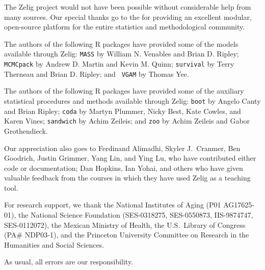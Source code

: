 The Zelig project would not have been possible without considerable
help from many sources.  Our special thanks go to the  for providing an
excellent modular, open-source platform for the entire statistics and
methodological community.

The authors of the following R packages have provided some of the
models available through Zelig: {\tt MASS} by William N. Venables and
Brian D. Ripley; {\tt MCMCpack} by Andrew D. Martin and Kevin M.
Quinn; {\tt survival} by Terry Therneau and Brian D. Ripley; and {\tt
  VGAM} by Thomas Yee.  

The authors of the following R packages have provided some of the
auxiliary statistical procedures and methods available through Zelig:
{\tt boot} by Angelo Canty and Brian Ripley; {\tt coda} by Martyn
Plummer, Nicky Best, Kate Cowles, and Karen Vines; {\tt sandwich} by
Achim Zeileis; and {\tt zoo} by Achim Zeileis and Gabor Grothendieck.

Our appreciation also goes to Ferdinand Alimadhi, Skyler J.\ Cranmer,
Ben Goodrich, Justin Grimmer, Yang Lin, and Ying Lu, who have
contributed either code or documentation; Dan Hopkins, Ian Yohai, and
others who have given valuable feedback from the courses in which they
have used Zelig as a teaching tool.

For research support, we thank the National Institutes of Aging (P01
AG17625-01), the National Science Foundation (SES-0318275,
SES-0550873, IIS-9874747, SES-0112072), the Mexican Ministry of
Health, the U.S.\ Library of Congress (PA\# NDP03-1), and the
Princeton University Committee on Research in the Humanities and
Social Sciences.

As usual, all errors are our responsibility.

